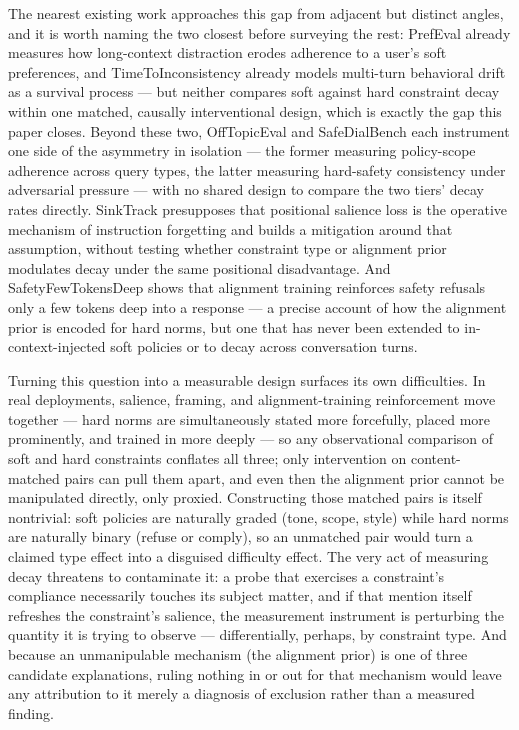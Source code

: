 \documentclass[11pt]{article}
\begin{document}
The nearest existing work approaches this gap from adjacent but distinct angles, and it is worth naming the two closest before surveying the rest: PrefEval already measures how long-context distraction erodes adherence to a user's soft preferences, and TimeToInconsistency already models multi-turn behavioral drift as a survival process --- but neither compares soft against hard constraint decay within one matched, causally interventional design, which is exactly the gap this paper closes. Beyond these two, OffTopicEval and SafeDialBench each instrument one side of the asymmetry in isolation --- the former measuring policy-scope adherence across query types, the latter measuring hard-safety consistency under adversarial pressure --- with no shared design to compare the two tiers' decay rates directly. SinkTrack presupposes that positional salience loss is the operative mechanism of instruction forgetting and builds a mitigation around that assumption, without testing whether constraint type or alignment prior modulates decay under the same positional disadvantage. And SafetyFewTokensDeep shows that alignment training reinforces safety refusals only a few tokens deep into a response --- a precise account of how the alignment prior is encoded for hard norms, but one that has never been extended to in-context-injected soft policies or to decay across conversation turns.

Turning this question into a measurable design surfaces its own difficulties. In real deployments, salience, framing, and alignment-training reinforcement move together --- hard norms are simultaneously stated more forcefully, placed more prominently, and trained in more deeply --- so any observational comparison of soft and hard constraints conflates all three; only intervention on content-matched pairs can pull them apart, and even then the alignment prior cannot be manipulated directly, only proxied. Constructing those matched pairs is itself nontrivial: soft policies are naturally graded (tone, scope, style) while hard norms are naturally binary (refuse or comply), so an unmatched pair would turn a claimed type effect into a disguised difficulty effect. The very act of measuring decay threatens to contaminate it: a probe that exercises a constraint's compliance necessarily touches its subject matter, and if that mention itself refreshes the constraint's salience, the measurement instrument is perturbing the quantity it is trying to observe --- differentially, perhaps, by constraint type. And because an unmanipulable mechanism (the alignment prior) is one of three candidate explanations, ruling nothing in or out for that mechanism would leave any attribution to it merely a diagnosis of exclusion rather than a measured finding.
\end{document}
